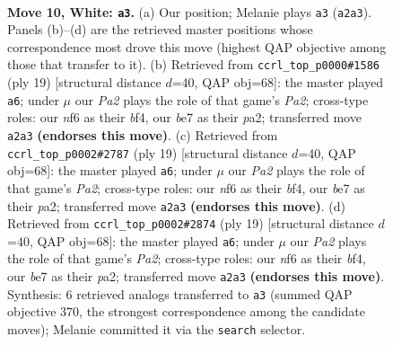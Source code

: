 \documentclass[11pt]{article}
\begin{document}
\clearpage

\begin{figure}[p]\centering
\begin{subfigure}{0.46\textwidth}\centering
\resizebox{\linewidth}{!}{%
\newchessgame
\chessboard[
  setfen={r2q1rk1/pp1bbppp/2n1pn2/2Pp4/3P4/2N2N2/PP2BPPP/R1BQ1RK1 w - - 5 10},
  showmover=false,
  pgfstyle=straightmove, color=movearrow, markmove={a2-a3}
]}
\caption{}
\end{subfigure}\hfill
\begin{subfigure}{0.46\textwidth}\centering
\resizebox{\linewidth}{!}{%
\newchessgame
\chessboard[
  setfen={r1bq1rk1/pp2bppp/2n2n2/3p4/2pP1B2/2N1P3/PPB1NPPP/R2Q1RK1 b - - 1 10},
  showmover=false,
  pgfstyle=straightmove, color=movearrow, markmove={a7-a6}
]}
\caption{}
\end{subfigure}
\\[4pt]
\begin{subfigure}{0.46\textwidth}\centering
\resizebox{\linewidth}{!}{%
\newchessgame
\chessboard[
  setfen={r1bq1rk1/pp2bppp/2n2n2/3p4/2pP1B2/2N1P3/PPB1NPPP/R2Q1RK1 b - - 1 10},
  showmover=false,
  pgfstyle=straightmove, color=movearrow, markmove={a7-a6}
]}
\caption{}
\end{subfigure}\hfill
\begin{subfigure}{0.46\textwidth}\centering
\resizebox{\linewidth}{!}{%
\newchessgame
\chessboard[
  setfen={r1bq1rk1/pp2bppp/2n2n2/3p4/2pP1B2/2N1P3/PPB1NPPP/R2Q1RK1 b - - 1 10},
  showmover=false,
  pgfstyle=straightmove, color=movearrow, markmove={a7-a6}
]}
\caption{}
\end{subfigure}
\caption{\textbf{Move 10, White: \texttt{a3}.} (a) Our position; Melanie plays \texttt{a3} (\texttt{a2a3}). Panels (b)--(d) are the retrieved master positions whose correspondence most drove this move (highest QAP objective among those that transfer to it). (b) Retrieved from \texttt{ccrl\_top\_p0000\#1586} (ply 19) [structural distance $d$=40, QAP obj=68]: the master played \texttt{a6}; under $\mu$ our \emph{Pa2} plays the role of that game's \emph{Pa2}; cross-type roles: our \emph{n}f6 as their \emph{b}f4, our \emph{b}e7 as their \emph{p}a2; transferred move \texttt{a2a3} \textbf{(endorses this move)}. (c) Retrieved from \texttt{ccrl\_top\_p0002\#2787} (ply 19) [structural distance $d$=40, QAP obj=68]: the master played \texttt{a6}; under $\mu$ our \emph{Pa2} plays the role of that game's \emph{Pa2}; cross-type roles: our \emph{n}f6 as their \emph{b}f4, our \emph{b}e7 as their \emph{p}a2; transferred move \texttt{a2a3} \textbf{(endorses this move)}. (d) Retrieved from \texttt{ccrl\_top\_p0002\#2874} (ply 19) [structural distance $d$=40, QAP obj=68]: the master played \texttt{a6}; under $\mu$ our \emph{Pa2} plays the role of that game's \emph{Pa2}; cross-type roles: our \emph{n}f6 as their \emph{b}f4, our \emph{b}e7 as their \emph{p}a2; transferred move \texttt{a2a3} \textbf{(endorses this move)}. Synthesis: 6 retrieved analogs transferred to \texttt{a3} (summed QAP objective 370, the strongest correspondence among the candidate moves); Melanie committed it via the \texttt{search} selector.}
\label{fig:thought-m18}
\end{figure}
\end{document}
